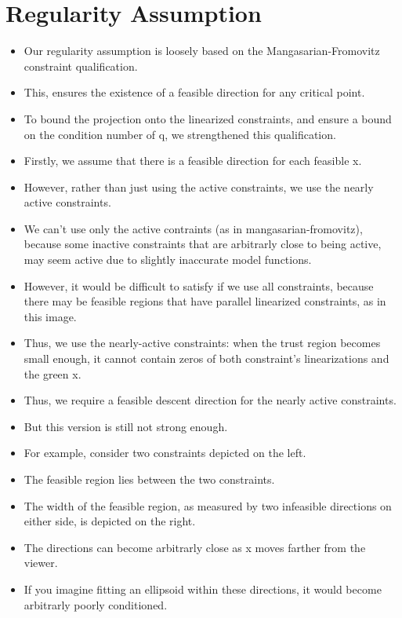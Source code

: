\documentclass{article}
\begin{document}
	\section{Regularity Assumption}
\begin{itemize}
\item Our regularity assumption is loosely based on the Mangasarian-Fromovitz constraint qualification.
\item This, ensures the existence of a feasible direction for any critical point.
\item To bound the projection onto the linearized constraints, and ensure a bound on the condition number of q, we strengthened this qualification.
\item Firstly, we assume that there is a feasible direction for each feasible x.
\item However, rather than just using the active constraints, we use the nearly active constraints.
\end{itemize}

\hrulefill

\begin{itemize}
\item We can't use only the active contraints (as in mangasarian-fromovitz), because some inactive constraints that are arbitrarly close to being active, may seem active due to slightly inaccurate model functions.
\item However, it would be difficult to satisfy if we use all constraints,  because there may be feasible regions that have parallel linearized constraints, as in this image.
\item Thus, we use the nearly-active constraints: when the trust region becomes small enough, it cannot contain zeros of both constraint's linearizations and the green x.
\end{itemize}

\hrulefill

\begin{itemize}
\item Thus, we require a feasible descent direction for the nearly active constraints.
\end{itemize}

\hrulefill

\begin{itemize}
\item But this version is still not strong enough.
\item For example, consider two constraints depicted on the left.
\item The feasible region lies between the two constraints.
\item The width of the feasible region, as measured by two infeasible directions on either side, is depicted on the right.
\item The directions can become arbitrarly close as x moves farther from the viewer.
\item If you imagine fitting an ellipsoid within these directions, it would become arbitrarly poorly conditioned.
\end{itemize}
\end{document}
